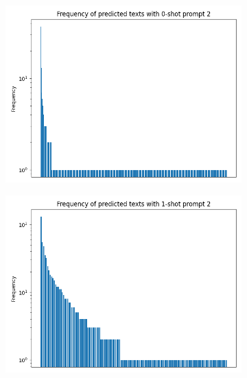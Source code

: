 \begin{figure}[ht]
    \centering

    \begin{subfigure}{0.31\textwidth}
        \includegraphics[width=\linewidth]{Images/0-shot_prompt_2_freq_plot.png}
    \end{subfigure}
    \hfill
    \begin{subfigure}{0.31\textwidth}
        \includegraphics[width=\linewidth]{Images/1-shot_prompt_2_freq_plot.png}
    \end{subfigure}
    \hfill
    \begin{subfigure}{0.31\textwidth}

\end{subfigure}
\end{figure}
